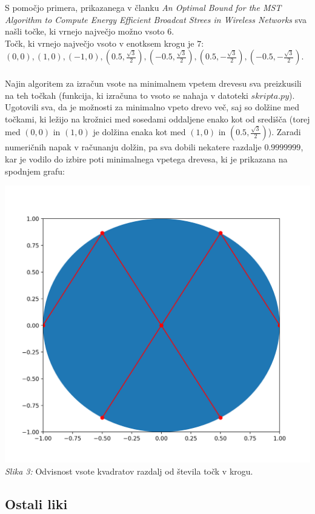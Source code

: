 \documentclass[a4paper]{article}
\begin{document}
S pomočjo primera, prikazanega v članku \textit{An Optimal Bound for the MST Algorithm to Compute Energy Efficient Broadcat Strees in Wireless Networks} sva našli točke, ki vrnejo največjo možno vsoto $6$. \\
Točk, ki vrnejo največjo vsoto v enotksem krogu je $7$: $(0,0), (1,0), (-1,0), (0.5, \frac{\sqrt{3}}{2}), (-0.5, \frac{\sqrt{3}}{2}), (0.5, -\frac{\sqrt{3}}{2}), (-0.5, -\frac{\sqrt{3}}{2})$. \\ \\
Najin algoritem za izračun vsote na minimalnem vpetem drevesu sva preizkusili na teh točkah (funkcija, ki izračuna to vsoto se nahaja v datoteki \colorbox{gray!10}{$skripta.py$}). Ugotovili sva, da je možnosti za minimalno vpeto drevo več, saj so dolžine med točkami, ki ležijo na krožnici med sosedami oddaljene enako kot od središča (torej med $(0,0)$ in $(1,0)$ je dolžina enaka kot med $(1,0)$ in $(0.5, \frac{\sqrt{3}}{2})$). Zaradi numeričnih napak v računanju dolžin, pa sva dobili nekatere razdalje $0.9999999$, kar je vodilo do izbire poti minimalnega vpetega drevesa, ki je prikazana na spodnjem grafu:
\begin{center}
\includegraphics[scale = 0.3]{krog_vsota6}\\ 
\scriptsize{\textit{Slika 3: }  Odvisnost vsote kvadratov razdalj od števila točk v krogu.}
\end{center}


\subsection{Ostali liki}
\end{document}
